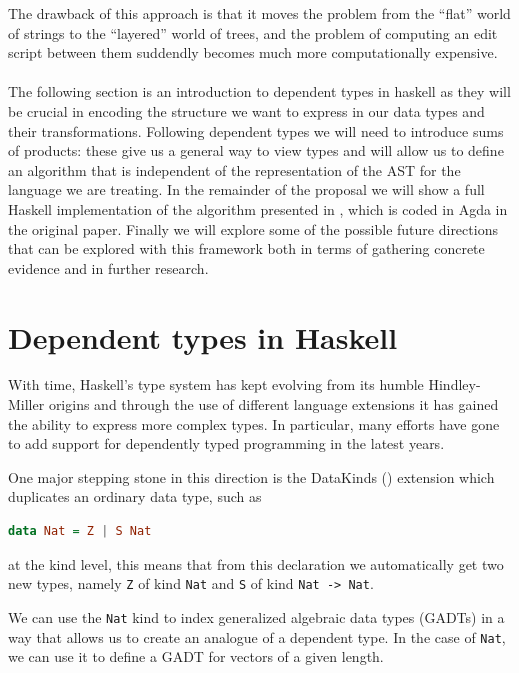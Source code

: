 \documentclass[11pt]{article}
\begin{document}
The drawback of this approach is that it moves the problem from the ``flat'' 
world of strings to the ``layered'' world of trees, and the problem of computing an edit script between them suddendly
becomes much more computationally expensive. 
\\\\
The following section is an introduction to dependent types in haskell as they will be crucial in encoding 
the structure we want to express in our data types and their transformations. 
Following dependent types we will need to introduce sums of products: these give us a general way to view 
types and will allow us to define an algorithm that is independent of the representation of the AST for the language 
we are treating.
In the remainder of the proposal we will show a full Haskell implementation of the algorithm presented in 
\cite{type-directed-diff}, which is coded in Agda in the original paper. Finally we will explore some of the possible 
future directions that can be explored with this framework both in terms of 
gathering concrete evidence and in further research.

\section{Dependent types in
Haskell}\label{dependent-types-in-haskell}

With time, Haskell's type system has kept evolving from its humble
Hindley-Miller origins and through the use of different language extensions it has gained the ability 
to express more complex types. In particular, many efforts have gone to add support for dependently
typed programming in the latest years.

One major stepping stone in this direction is the DataKinds (\cite{datakinds}) extension which duplicates an ordinary data type, such as

\begin{lstlisting}[language=haskell]
data Nat = Z | S Nat
\end{lstlisting}

at the kind level, this means that from this declaration we automatically get two new types, namely \texttt{Z} of kind \texttt{Nat}
and \texttt{S} of kind \texttt{Nat\ -\textgreater{}\ Nat}.

We can use the \texttt{Nat} kind to index generalized algebraic data
types (GADTs) in a way that allows us to create an analogue of a
dependent type. In the case of \texttt{Nat}, we can use it to define a
GADT for vectors of a given length.
\end{document}
